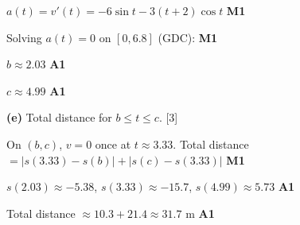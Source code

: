 \documentclass[12pt, twoside]{article}
\begin{document}
\begin{enumerate}[itemsep=0.3cm]
$a(t) = v'(t) = -6\sin t - 3(t + 2)\cos t$ \hfill \textbf{M1}

Solving $a(t) = 0$ on $[0, 6.8]$ (GDC): \hfill \textbf{M1}

$b \approx 2.03$ \hfill \textbf{A1}

$c \approx 4.99$ \hfill \textbf{A1}

\medskip

\textbf{(e)} Total distance for $b \leq t \leq c$. \hfill [3]

On $(b, c)$, $v = 0$ once at $t \approx 3.33$. Total distance
$= |s(3.33) - s(b)| + |s(c) - s(3.33)|$ \hfill \textbf{M1}

$s(2.03) \approx -5.38$, \; $s(3.33) \approx -15.7$, \;
$s(4.99) \approx 5.73$ \hfill \textbf{A1}

\nopagebreak

Total distance $\approx 10.3 + 21.4 \approx 31.7$ m \hfill \textbf{A1}

\end{enumerate}
\end{document}
